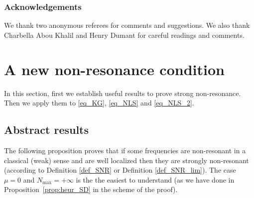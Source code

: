 \subsubsection*{Acknowledgements}
We thank two anonymous referees for comments and suggestions. We also thank Charbella Abou Khalil and Henry Dumant for careful readings and comments.

\section{A new non-resonance condition}
\label{sec_NR}

In this section, first we establish useful results to prove strong non-resonance. Then we apply them to \eqref{eq_KG}, \eqref{eq_NLS} and \eqref{eq_NLS_2}.

\subsection{Abstract results}
The following proposition proves that if some frequencies are non-resonant in a classical (weak) sense and are well localized then they are strongly non-resonant (according to Definition \ref{def_SNR} or Definition \ref{def_SNR_lim}). The case $\mu=0$ and $N_{\max}=+\infty$ is the the easiest to understand (as we have done in Proposition~\ref{prop:heur_SD} in the scheme of the proof).

